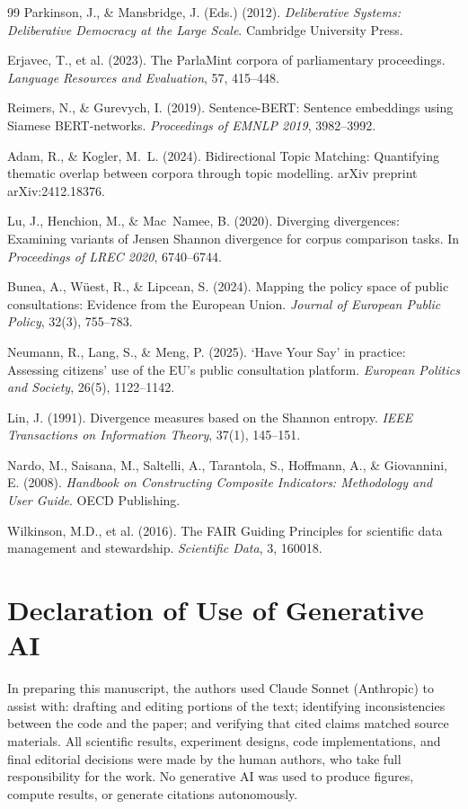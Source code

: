 \documentclass[sigconf,natbib]{acmart}
\begin{document}
\begin{thebibliography}{99}
Parkinson, J., \& Mansbridge, J. (Eds.) (2012).
\textit{Deliberative Systems: Deliberative Democracy at the Large Scale}.
Cambridge University Press.

Erjavec, T., et al. (2023).
The ParlaMint corpora of parliamentary proceedings.
\textit{Language Resources and Evaluation}, 57, 415--448.

Reimers, N., \& Gurevych, I. (2019).
Sentence-BERT: Sentence embeddings using Siamese BERT-networks.
\textit{Proceedings of EMNLP 2019}, 3982--3992.

Adam, R., \& Kogler, M.~L. (2024).
Bidirectional Topic Matching: Quantifying thematic overlap between corpora through topic modelling.
arXiv preprint arXiv:2412.18376.

Lu, J., Henchion, M., \& Mac~Namee, B. (2020).
Diverging divergences: Examining variants of Jensen Shannon divergence for corpus comparison tasks.
In \textit{Proceedings of LREC 2020}, 6740--6744.

Bunea, A., W\"uest, R., \& Lipcean, S. (2024).
Mapping the policy space of public consultations: Evidence from the European Union.
\textit{Journal of European Public Policy}, 32(3), 755--783.

Neumann, R., Lang, S., \& Meng, P. (2025).
`Have Your Say' in practice: Assessing citizens' use of the EU's public consultation platform.
\textit{European Politics and Society}, 26(5), 1122--1142.

Lin, J. (1991).
Divergence measures based on the Shannon entropy.
\textit{IEEE Transactions on Information Theory}, 37(1), 145--151.

Nardo, M., Saisana, M., Saltelli, A., Tarantola, S., Hoffmann, A., \& Giovannini, E. (2008).
\textit{Handbook on Constructing Composite Indicators: Methodology and User Guide}.
OECD Publishing.

Wilkinson, M.D., et al. (2016).
The FAIR Guiding Principles for scientific data management and stewardship.
\textit{Scientific Data}, 3, 160018.

\end{thebibliography}

\section*{Declaration of Use of Generative AI}

In preparing this manuscript, the authors used Claude Sonnet (Anthropic) to assist with:
drafting and editing portions of the text; identifying inconsistencies between the code and the paper;
and verifying that cited claims matched source materials.
All scientific results, experiment designs, code implementations, and final editorial decisions were made by the human authors, who take full responsibility for the work.
No generative AI was used to produce figures, compute results, or generate citations autonomously.
\end{document}
